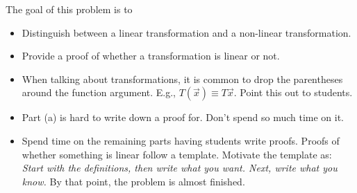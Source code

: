 	\question
	\begin{annotation}
		\begin{goals}

			The goal of this problem is to
			\begin{itemize}
				\item Distinguish between a linear transformation and a non-linear transformation.
				\item Provide a proof of whether a transformation is linear or not.
			\end{itemize}
		\end{goals}

		\begin{notes}
			\begin{itemize}
				\item When talking about transformations, it is common
					to drop the parentheses around the function argument. 
					E.g., $T(\vec x)\equiv T\vec x$. Point this out to students.
				\item Part (a) is hard to write down a proof for. Don't spend so much time on it.
				\item Spend time on the remaining parts having students write proofs. Proofs 
					of whether something is linear follow a template. Motivate the template as: 
					\emph{Start with the definitions, then write what you want. Next, write what you know.}
					By that point, the problem is almost finished.
			\end{itemize}
		\end{notes}
	\end{annotation}
